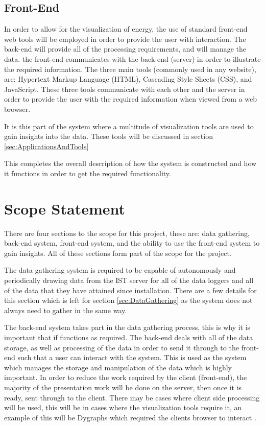 \documentclass[12pt,onecolumn]{IEEEtran}
\begin{document}
\subsection{Front-End} \label{sec:FrontEnd}
In order to allow for the visualization of energy, the use of standard front-end web tools will be employed in order to provide the user with interaction. 
The back-end will provide all of the processing requirements, and will manage the data. the front-end communicates with the back-end (server) in order to illustrate the required information.
The three main tools (commonly used in any website), are: Hypertext Markup Language (HTML), Cascading Style Sheets (CSS), and JavaScript. 
These three tools communicate with each other and the server in order to provide the user with the required information when viewed from a web browser. 

It is this part of the system where a multitude of visualization tools are used to gain insights into the data. These tools will be discussed in section \ref{sec:ApplicationsAndTools}

This completes the overall description of how the system is constructed and how it functions in order to get the required functionality.


\section{Scope Statement} \label{sec:ScopeStatement}
There are four sections to the scope for this project, these are: data gathering, back-end system, front-end system, and the ability to use the front-end system to gain insights. All of these sections form part of the scope for the project. 

The data gathering system is required to be capable of autonomously and periodically drawing data from the IST server for all of the data loggers and all of the data that they have attained since installation. There are a few details for this section which is left for section \ref{sec:DataGathering} as the system does not always need to gather in the same way.

The back-end system takes part in the data gathering process, this is why it is important that if functions as required. The back-end deals with all of the data storage, as well as processing of the data in order to send it through to the front-end such that a user can interact with the system. This is used as the system which manages the storage and manipulation of the data which is highly important. 
In order to reduce the work required by the client (front-end), the majority of the presentation work will be done on the server, then once it is ready, sent through to the client. 
There may be cases where client side processing will be used, this will be in cases where the visualization tools require it, an example of this will be Dygraphs which required the clients browser to interact \cite{dygraphs}.
\end{document}
